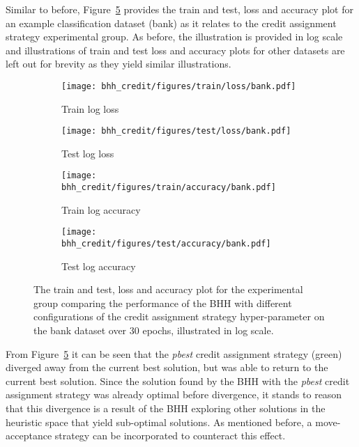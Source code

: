 Similar to before, Figure~\ref{fig:results:credit:figures:bank} provides the train and test, loss and accuracy plot for an example classification dataset (bank) as it relates to the credit assignment strategy experimental group. As before, the illustration is provided in log scale and illustrations of train and test loss and accuracy plots for other datasets are left out for brevity as they yield similar illustrations.

\begin{figure}[htbp]
	\begin{subfigure}{0.5\textwidth}
		\centering
		\texttt{[image: bhh\_credit/figures/train/loss/bank.pdf]}
		\caption{Train log loss}
		\label{fig:results:credit:figures:loss:train:bank}
	\end{subfigure}
	\begin{subfigure}{0.5\textwidth}
		\centering
		\texttt{[image: bhh\_credit/figures/test/loss/bank.pdf]}
		\caption{Test log loss}
		\label{fig:results:credit:figures:loss:test:bank}
	\end{subfigure}
	\par\bigskip
	\begin{subfigure}{0.5\textwidth}
		\centering
		\texttt{[image: bhh\_credit/figures/train/accuracy/bank.pdf]}
		\caption{Train log accuracy}
		\label{fig:results:credit:figures:accuracy:train:bank}
	\end{subfigure}
	\begin{subfigure}{0.5\textwidth}
		\centering
		\texttt{[image: bhh\_credit/figures/test/accuracy/bank.pdf]}
		\caption{Test log accuracy}
		\label{fig:results:credit:figures:accuracy:test:bank}
	\end{subfigure}
	\par\bigskip
	\caption{The train and test, loss and accuracy plot for the experimental group comparing the performance of the \acs{BHH} with different configurations of the credit assignment strategy hyper-parameter on the bank dataset over 30 epochs, illustrated in log scale.}
	\label{fig:results:credit:figures:bank}
\end{figure}

From Figure~\ref{fig:results:credit:figures:bank} it can be seen that the \textit{pbest} credit assignment strategy (green) diverged away from the current best solution, but was able to return to the current best solution. Since the solution found by the \acs{BHH} with the \textit{pbest} credit assignment strategy was already optimal before divergence, it stands to reason that this divergence is a result of the \acs{BHH} exploring other solutions in the heuristic space that yield sub-optimal solutions. As mentioned before, a move-acceptance strategy can be incorporated to counteract this effect.

